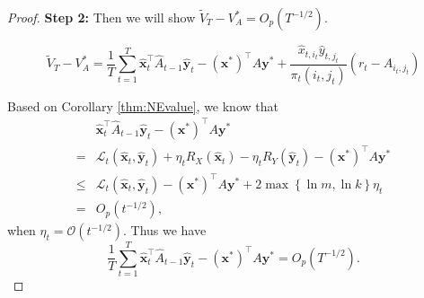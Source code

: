 \documentclass[12pt]{article}
\begin{document}
\begin{proof}
\textbf{Step 2:} Then we will show $\widetilde{V}_T - V^\ast_A = O_p(T^{-1/2})$.

\begin{equation}
\label{tildeV_T - barV_T}
    \widetilde{V}_T - V^\ast_A = \frac{1}{T}\sum_{t=1}^T \widehat{\bm{x}}_t^\top \widehat{A}_{t-1}\widehat{\bm{y}}_t - (\bm{x}^\ast)^\top A \bm{y}^\ast + \frac{\widehat{x}_{t,i_t}\widehat{y}_{t,j_t}}{{\pi}_t(i_t,j_t)}(r_t-A_{i_t,j_t})
\end{equation}

Based on Corollary \ref{thm:NEvalue}, we know that 
\begin{align*}
    &\widehat{\bm{x}}_t^\top \widehat{A}_{t-1}\widehat{\bm{y}}_t - (\bm{x}^\ast)^\top A \bm{y}^\ast\\
    =& \mathcal{L}_t(\widehat{\bm{x}}_t,\widehat{\bm{y}}_t)+ \eta_t R_X(\widehat{\bm{x}}_t)- \eta_t R_Y(\widehat{\bm{y}}_t)-(\bm{x}^\ast)^\top A \bm{y}^\ast\\
    \le &\mathcal{L}_t(\widehat{\bm{x}}_t,\widehat{\bm{y}}_t)- (\bm{x}^\ast)^\top A \bm{y}^\ast + 2\max\left\{\ln m,\ln k\right\}\eta_t\\
    =& O_p(t^{-1/2}),
\end{align*}
when $\eta_t = \mathcal{O}(t^{-1/2})$. Thus we have
\begin{equation}
\label{firstinstep2}
\frac{1}{T} \sum_{t=1}^T \widehat{\bm{x}}_t^\top \widehat{A}_{t-1}\widehat{\bm{y}}_t - (\bm{x}^\ast)^\top A \bm{y}^\ast = O_p(T^{-1/2}).
\end{equation}


\end{proof}
\end{document}
